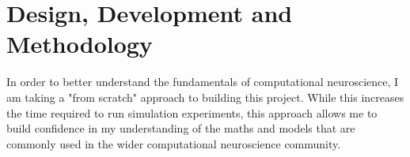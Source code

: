 \chapter{Design, Development and Methodology}


In order to better understand the fundamentals of computational neuroscience, I
am taking a "from scratch" approach to building this project. While this
increases the time required to run simulation experiments, this approach allows
me to build confidence in my understanding of the maths and models that are
commonly used in the wider computational neuroscience community.




